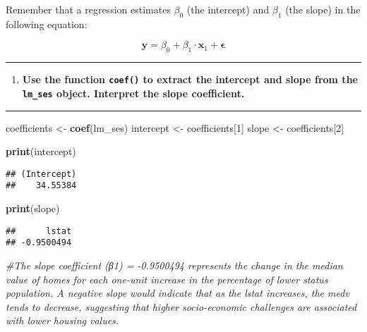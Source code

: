 \documentclass[
  12pt,
]{article}
\newenvironment{Shaded}{\begin{snugshade}}{\end{snugshade}}
\newcommand{\CommentTok}[1]{\textcolor[rgb]{0.56,0.35,0.01}{\textit{#1}}}
\newcommand{\DecValTok}[1]{\textcolor[rgb]{0.00,0.00,0.81}{#1}}
\newcommand{\FunctionTok}[1]{\textcolor[rgb]{0.13,0.29,0.53}{\textbf{#1}}}
\newcommand{\NormalTok}[1]{#1}
\newcommand{\OtherTok}[1]{\textcolor[rgb]{0.56,0.35,0.01}{#1}}
\providecommand{\tightlist}{%
  \setlength{\itemsep}{0pt}\setlength{\parskip}{0pt}}
\begin{document}
Remember that a regression estimates \(\beta_0\) (the intercept) and
\(\beta_1\) (the slope) in the following equation:

\[\boldsymbol{y} = \beta_0 + \beta_1\cdot \boldsymbol{x}_1 + \boldsymbol{\epsilon}\]

\begin{center}\rule{0.5\linewidth}{0.5pt}\end{center}

\begin{enumerate}
\def\labelenumi{\arabic{enumi}.}
\setcounter{enumi}{1}
\tightlist
\item
  \textbf{Use the function \texttt{coef()} to extract the intercept and
  slope from the \texttt{lm\_ses} object. Interpret the slope
  coefficient.}
\end{enumerate}

\begin{center}\rule{0.5\linewidth}{0.5pt}\end{center}

\begin{Shaded}
\begin{Highlighting}[]
\NormalTok{coefficients }\OtherTok{\textless{}{-}} \FunctionTok{coef}\NormalTok{(lm\_ses)}
\NormalTok{intercept }\OtherTok{\textless{}{-}}\NormalTok{ coefficients[}\DecValTok{1}\NormalTok{]}
\NormalTok{slope }\OtherTok{\textless{}{-}}\NormalTok{ coefficients[}\DecValTok{2}\NormalTok{]}

\FunctionTok{print}\NormalTok{(intercept)}
\end{Highlighting}
\end{Shaded}

\begin{verbatim}
## (Intercept) 
##    34.55384
\end{verbatim}

\begin{Shaded}
\begin{Highlighting}[]
\FunctionTok{print}\NormalTok{(slope)}
\end{Highlighting}
\end{Shaded}

\begin{verbatim}
##      lstat 
## -0.9500494
\end{verbatim}

\begin{Shaded}
\begin{Highlighting}[]
\CommentTok{\#The slope coefficient (β1) = {-}0.9500494 represents the change in the median value of homes for each one{-}unit increase in the percentage of lower status population. A negative slope would indicate that as the lstat increases, the medv tends to decrease, suggesting that higher socio{-}economic challenges are associated with lower housing values.}
\end{Highlighting}
\end{Shaded}
\end{document}
